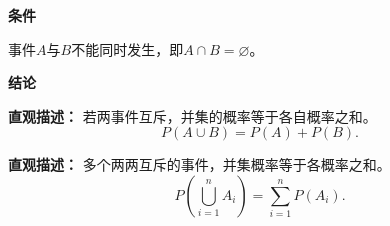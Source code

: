 \begin{statementbox}
	\textbf{\textcolor{CStatement}{条件}}
	\begin{description}[style=nextline, leftmargin=2.8em, labelsep=0.5em, itemsep=0.35em]
		\item[\textbf{\textcolor{CStatement}{条件 1（事件互斥）：}}]
		      事件$A$与$B$不能同时发生，即$A\cap B=\varnothing$。
	\end{description}

	\medskip
	\textbf{\textcolor{CStatement}{结论}}
	\begin{description}[style=nextline, leftmargin=2.8em, labelsep=0.5em, itemsep=0.45em]
		\item[\textbf{\textcolor{CStatement}{结论一（加法公式）：}}]
		      \textbf{\textcolor{CStatement}{直观描述：}}
		      若两事件互斥，并集的概率等于各自概率之和。
		      \[
			      P(A\cup B)=P(A)+P(B).
		      \]

		\item[\textbf{\textcolor{CStatement}{推广结论（有限加法）：}}]
		      \textbf{\textcolor{CStatement}{直观描述：}}
		      多个两两互斥的事件，并集概率等于各概率之和。
		      \[
			      P\left(\bigcup_{i=1}^{n}A_i\right)
			      =
			      \sum_{i=1}^{n}P(A_i).
		      \]
	\end{description}
\end{statementbox}